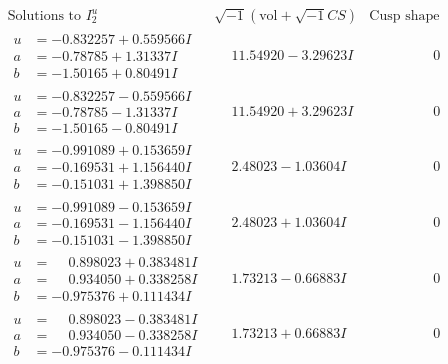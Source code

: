 \documentclass[1p]{elsarticle_modified}
\theoremstyle{definition}
\newcommand{\I}{\sqrt{-1}}
\begin{document}
$$\begin{array}{c|c|c}  
\text{Solutions to }I^u_{2}& \I (\text{vol} + \sqrt{-1}CS) & \text{Cusp shape}\\
 \hline 
\begin{aligned}
u &= -0.832257 + 0.559566 I \\
a &= -0.78785 + 1.31337 I \\
b &= -1.50165 + 0.80491 I\end{aligned}
 & \phantom{-}11.54920 - 3.29623 I & \phantom{-0.000000 } 0 \\ \hline\begin{aligned}
u &= -0.832257 - 0.559566 I \\
a &= -0.78785 - 1.31337 I \\
b &= -1.50165 - 0.80491 I\end{aligned}
 & \phantom{-}11.54920 + 3.29623 I & \phantom{-0.000000 } 0 \\ \hline\begin{aligned}
u &= -0.991089 + 0.153659 I \\
a &= -0.169531 + 1.156440 I \\
b &= -0.151031 + 1.398850 I\end{aligned}
 & \phantom{-}2.48023 - 1.03604 I & \phantom{-0.000000 } 0 \\ \hline\begin{aligned}
u &= -0.991089 - 0.153659 I \\
a &= -0.169531 - 1.156440 I \\
b &= -0.151031 - 1.398850 I\end{aligned}
 & \phantom{-}2.48023 + 1.03604 I & \phantom{-0.000000 } 0 \\ \hline\begin{aligned}
u &= \phantom{-}0.898023 + 0.383481 I \\
a &= \phantom{-}0.934050 + 0.338258 I \\
b &= -0.975376 + 0.111434 I\end{aligned}
 & \phantom{-}1.73213 - 0.66883 I & \phantom{-0.000000 } 0 \\ \hline\begin{aligned}
u &= \phantom{-}0.898023 - 0.383481 I \\
a &= \phantom{-}0.934050 - 0.338258 I \\
b &= -0.975376 - 0.111434 I\end{aligned}
 & \phantom{-}1.73213 + 0.66883 I & \phantom{-0.000000 } 0 \\ \hline\begin{aligned}

\end{aligned}
\end{array}$$
\end{document}
